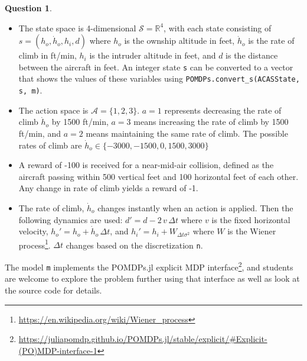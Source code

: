 \documentclass{article}
\theoremstyle{definition}
\newtheorem{question}[thm]{Question}
\newcommand{\reals}{\mathbb{R}}
\begin{document}
\begin{question}
\begin{itemize}
    \item The state space is 4-dimensional $\mathcal{S} = \reals^4$, with each state consisting of $s=(h_o, \dot{h}_o, h_i, d)$ where $h_o$ is the ownship altitude in feet, $\dot{h}_o$ is the rate of climb in ft/min, $h_i$ is the intruder altitude in feet, and $d$ is the distance between the aircraft in feet. An integer state \texttt{s} can be converted to a vector that shows the values of these variables using \texttt{POMDPs.convert\_s(ACASState, s, m)}.
    \item The action space is $\mathcal{A}=\{1,2,3\}$. $a=1$ represents decreasing the rate of climb $\dot{h}_o$ by 1500 ft/min, $a=3$ means increasing the rate of climb by 1500 ft/min, and $a=2$ means maintaining the same rate of climb. The possible rates of climb are $\dot{h}_o \in \{-3000, -1500, 0, 1500, 3000\}$
    \item A reward of -100 is received for a near-mid-air collision, defined as the aircraft passing within 500 vertical feet and 100 horizontal feet of each other. Any change in rate of climb yields a reward of -1.
    \item The rate of climb, $\dot{h}_o$ changes instantly when an action is applied. Then the following dynamics are used: $d' = d - 2\,v\,\Delta t$ where $v$ is the fixed horizontal velocity, $h_o' = h_o + \dot{h}_o\,\Delta t$, and $h_i' = h_i + W_{\Delta t \sigma^2}$ where $W$ is the Wiener process\footnote{\url{https://en.wikipedia.org/wiki/Wiener_process}}. $\Delta t$ changes based on the discretization \texttt{n}.
\end{itemize}

The model \texttt{m} implements the POMDPs.jl explicit MDP interface\footnote{\url{https://juliapomdp.github.io/POMDPs.jl/stable/explicit/\#Explicit-(PO)MDP-interface-1}}, and students are welcome to explore the problem further using that interface as well as look at the source code for details.

\end{question}
\end{document}
